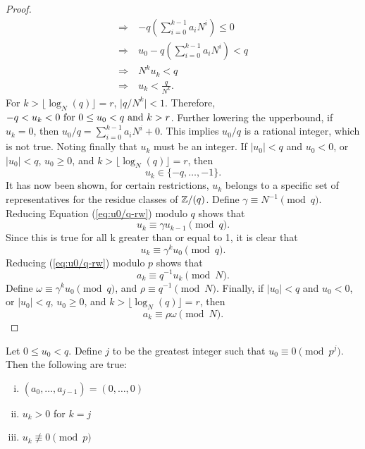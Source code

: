 \begin{proof}
\begin{align*}
    \Rightarrow &-q\left(\sum_{i=0}^{k-1}a_iN^i\right) \leq 0 \\
    \Rightarrow \ &u_0-q\left(\sum_{i=0}^{k-1}a_iN^i\right)<q \\
    \Rightarrow \ &N^ku_k<q \\
    \Rightarrow \ &u_k<\frac{q}{N^k}.
  \end{align*}
  For $k>\lfloor\log_N(q)\rfloor=r$, $\lvert q/N^k \rvert < 1$. Therefore,
  $-q < u_k < 0 \ {\rm for} \ 0\leq u_0 < q \ {\rm and} \ k>r$.
  Further lowering the upperbound, if $u_k=0$, then
  $u_0/q=\sum_{i=0}^{k-1}a_iN^i+0$. This implies $u_0/q$ is a rational
  integer, which is not true. Noting finally that $u_k$ must be an integer.
  If $\lvert u_0 \rvert<q$ and $u_0<0$, or $\lvert u_0 \rvert<q$,
  $u_0\geq0$, and $k>\lfloor \log_N(q) \rfloor=r$, then
  \begin{equation*}
    u_k \in \{-q,\dots,-1\}.
  \end{equation*}
  It has now been shown, for certain restrictions, $u_k$ belongs to a
  specific set of representatives for the residue classes of $\mathbb{Z}/(q)$.
  Define $\gamma \equiv N^{-1} \pmod q$. Reducing Equation
  (\ref{eq:u0/q-rw}) modulo $q$ shows that
  \begin{equation}
    u_k \equiv \gamma u_{k-1} \pmod q.
  \end{equation}
  Since this is true for all k greater than or equal to 1, it is clear that
  \begin{equation}\label{eq:uk-mod-q}
    u_k \equiv \gamma^ku_0 \pmod q.
  \end{equation}
  Reducing (\ref{eq:u0/q-rw}) modulo $p$ shows that
  \begin{equation}\label{eq:ak-mod-p}
    a_k \equiv q^{-1}u_k \pmod N.
  \end{equation}
  Define $\omega \equiv \gamma^k u_0 \pmod q$, and
  $\rho \equiv q^{-1} \pmod N$.  Finally, if $\lvert u_0 \rvert<q$ and
  $u_0<0$, or $\lvert u_0 \rvert<q$, $u_0\geq0$, and
  $k>\lfloor \log_N(q) \rfloor=r$, then
  \begin{equation}\label{eq:ak-done}
    a_k \equiv \rho\omega \pmod N.
  \end{equation}
\end{proof}
\begin{corollary}\label{cor:aj}
  Let $0\leq u_0 < q$. Define $j$ to be the greatest integer such that
  $u_0 \equiv 0 \pmod{p^j}$. Then the following are true:
  \begin{enumerate}[i.]
    \item $(a_0,\dots,a_{j-1})=(0,\dots,0)$
    \item $u_k>0$ for $k=j$
    \item $u_k \not\equiv 0 \pmod p$
  \end{enumerate}
\end{corollary}

